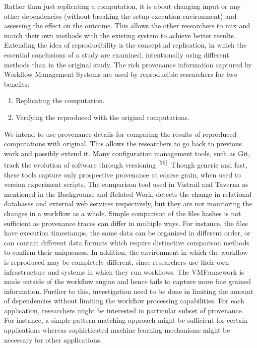 \documentclass[6pt,,a4paper]{article}
\begin{document}
Rather than just replicating a computation, it is about changing input or any other dependencies (without breaking the setup execution environment) and assessing the effect on the outcome. This allows the other researchers to mix and match their own methods with the existing system to achieve better results. Extending the idea of reproducibility is the conceptual replication, in which the essential conclusions of a study are examined, intentionally using different methods than in the original study. 
The rich provenance information captured by Workflow Management Systems are used by reproducible researchers for two benefits:
\begin{enumerate} \label{data}
       \item Replicating the computation.
	\item Verifying the reproduced with the original computations.
\end{enumerate}
We intend to use provenance details for comparing the results of reproduced computations with original. This allows the researchers to go back to previous work and possibly extend it. 
Many configuration management tools, such as Git, track the evolution of software through versioning \textsuperscript{[39]}. Though generic and fast, these tools capture only prospective provenance at coarse grain, when used to version experiment scripts. The comparison tool used in Vistrail and Taverna as mentioned in the Background and Related Work, detects the change in relational databases and external web services respectively, but they are not monitoring the changes in a workflow as a whole. Simple comparison of the files hashes is not sufficient as provenance traces can differ in multiple ways. For instance, the files have execution timestamps, the same data can be organized in different order, or can contain different data formats which require distinctive comparison methods to confirm their uniqueness. In addition, the environment in which the workflow is reproduced may be completely different, since researchers use their own infrastructure and systems in which they run workflows. 
The VMFramework is made outside of the workflow engine and hence fails to capture more fine grained information. Further to this, investigation need to be done in limiting the amount of dependencies without limiting the workflow processing capabilities. For each application, researchers might be interested in particular subset of provenance. For instance, a simple pattern matching approach might be sufficient for certain applications whereas sophisticated machine learning mechanisms might be necessary for other applications. 
\end{document}
